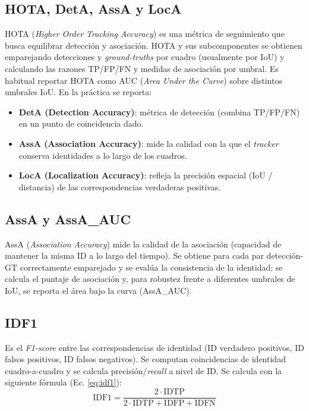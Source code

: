 
\subsection{HOTA, DetA, AssA y LocA}
HOTA \cite{HOTA} (\textit{Higher Order Tracking Accuracy}) es una métrica de seguimiento que busca equilibrar detección y asociación. HOTA y sus subcomponentes se obtienen emparejando detecciones y \textit{ground-truths} por cuadro (usualmente por IoU) y calculando las razones TP/FP/FN y medidas de asociación por umbral. Es habitual reportar HOTA como AUC (\textit{Area Under the Curve}) sobre distintos umbrales IoU. En la práctica se reporta:
\begin{itemize}
  \item \textbf{DetA (Detection Accuracy)}: métrica de detección (combina TP/FP/FN) en un punto de coincidencia dado.
  \item \textbf{AssA (Association Accuracy)}: mide la calidad con la que el \textit{tracker} conserva identidades a lo largo de los cuadros.
  \item \textbf{LocA (Localization Accuracy)}: refleja la precisión espacial (IoU / distancia) de las correspondencias verdaderas positivas.
\end{itemize}

\subsection{AssA y AssA\_AUC}
AssA (\textit{Association Accuracy}) mide la calidad de la asociación (capacidad de mantener la misma ID a lo largo del tiempo). Se obtiene para cada par detección-GT correctamente emparejado y se evalúa la consistencia de la identidad; se calcula el puntaje de asociación y, para robustez frente a diferentes umbrales de IoU, se reporta el área bajo la curva (AssA\_AUC).  

\subsection{IDF1}
Es el \textit{F1-score} entre las correspondencias de identidad (ID verdadero positivos, ID falsos positivos, ID falsos negativos). Se computan coincidencias de identidad cuadro-a-cuadro y se calcula precisión/\textit{recall} a nivel de ID. Se calcula con la siguiente fórmula (Ec. \ref{eq:idf1}):
\begin{equation}
\text{IDF1} = \frac{2 \cdot \text{IDTP}}{2\cdot\text{IDTP} + \text{IDFP} + \text{IDFN}}
\label{eq:idf1}
\end{equation}

